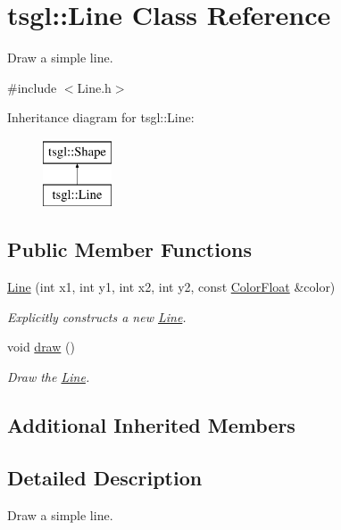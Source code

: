 \hypertarget{classtsgl_1_1_line}{\section{tsgl\-:\-:Line Class Reference}
\label{classtsgl_1_1_line}
}


Draw a simple line.  




{\ttfamily \#include $<$Line.\-h$>$}

Inheritance diagram for tsgl\-:\-:Line\-:\begin{figure}[H]
\begin{center}
\leavevmode
\includegraphics[height=2.000000cm]{classtsgl_1_1_line}
\end{center}
\end{figure}
\subsection*{Public Member Functions}
\begin{DoxyCompactItemize}
\item 
\hyperlink{classtsgl_1_1_line_af16488259ac5978679e13d58cf7e91ef}{Line} (int x1, int y1, int x2, int y2, const \hyperlink{structtsgl_1_1_color_float}{Color\-Float} \&color)
\begin{DoxyCompactList}\small\item\em Explicitly constructs a new \hyperlink{classtsgl_1_1_line}{Line}. \end{DoxyCompactList}\item 
void \hyperlink{classtsgl_1_1_line_ae7eccbbf5230a4c68139560d810af415}{draw} ()
\begin{DoxyCompactList}\small\item\em Draw the \hyperlink{classtsgl_1_1_line}{Line}. \end{DoxyCompactList}\end{DoxyCompactItemize}
\subsection*{Additional Inherited Members}


\subsection{Detailed Description}
Draw a simple line. 

